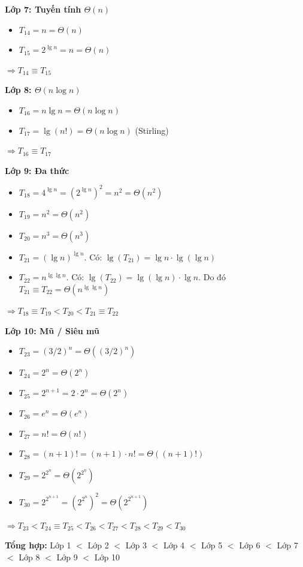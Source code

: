 \documentclass[12pt,a4paper]{article}
\begin{document}
\textbf{Lớp 7: Tuyến tính $\Theta(n)$}
\begin{itemize}
    \item $T_{14} = n = \Theta(n)$
    \item $T_{15} = 2^{\lg n} = n = \Theta(n)$
\end{itemize}
$\Rightarrow T_{14} \equiv T_{15}$

\textbf{Lớp 8: $\Theta(n \log n)$}
\begin{itemize}
    \item $T_{16} = n \lg n = \Theta(n \log n)$
    \item $T_{17} = \lg(n!) = \Theta(n \log n)$ (Stirling)
\end{itemize}
$\Rightarrow T_{16} \equiv T_{17}$

\textbf{Lớp 9: Đa thức}
\begin{itemize}
    \item $T_{18} = 4^{\lg n} = (2^{\lg n})^2 = n^2 = \Theta(n^2)$
    \item $T_{19} = n^2 = \Theta(n^2)$
    \item $T_{20} = n^3 = \Theta(n^3)$
    \item $T_{21} = (\lg n)^{\lg n}$. Có: $\lg(T_{21}) = \lg n \cdot \lg(\lg n)$
    \item $T_{22} = n^{\lg \lg n}$. Có: $\lg(T_{22}) = \lg(\lg n) \cdot \lg n$. Do đó $T_{21} \equiv T_{22} = \Theta(n^{\lg \lg n})$
\end{itemize}
$\Rightarrow T_{18} \equiv T_{19} < T_{20} < T_{21} \equiv T_{22}$

\textbf{Lớp 10: Mũ / Siêu mũ}
\begin{itemize}
    \item $T_{23} = (3/2)^n = \Theta((3/2)^n)$
    \item $T_{24} = 2^n = \Theta(2^n)$
    \item $T_{25} = 2^{n+1} = 2 \cdot 2^n = \Theta(2^n)$
    \item $T_{26} = e^n = \Theta(e^n)$
    \item $T_{27} = n! = \Theta(n!)$
    \item $T_{28} = (n+1)! = (n+1) \cdot n! = \Theta((n+1)!)$
    \item $T_{29} = 2^{2^n} = \Theta(2^{2^n})$
    \item $T_{30} = 2^{2^{n+1}} = (2^{2^n})^2 = \Theta(2^{2^{n+1}})$
\end{itemize}
$\Rightarrow T_{23} < T_{24} \equiv T_{25} < T_{26} < T_{27} < T_{28} < T_{29} < T_{30}$

\vspace{0.5cm}
\textbf{Tổng hợp:} Lớp 1 $<$ Lớp 2 $<$ Lớp 3 $<$ Lớp 4 $<$ Lớp 5 $<$ Lớp 6 $<$ Lớp 7 $<$ Lớp 8 $<$ Lớp 9 $<$ Lớp 10
\end{document}
